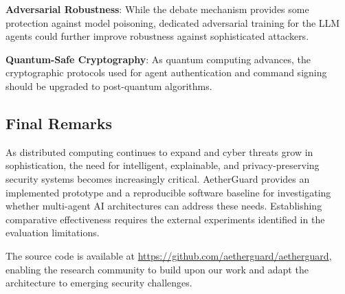 \textbf{Adversarial Robustness}: While the debate mechanism provides some protection against model poisoning, dedicated adversarial training for the LLM agents could further improve robustness against sophisticated attackers.

\textbf{Quantum-Safe Cryptography}: As quantum computing advances, the cryptographic protocols used for agent authentication and command signing should be upgraded to post-quantum algorithms.

\subsection{Final Remarks}

As distributed computing continues to expand and cyber threats grow in sophistication, the need for intelligent, explainable, and privacy-preserving security systems becomes increasingly critical. AetherGuard provides an implemented prototype and a reproducible software baseline for investigating whether multi-agent AI architectures can address these needs. Establishing comparative effectiveness requires the external experiments identified in the evaluation limitations.

The source code is available at \url{https://github.com/aetherguard/aetherguard}, enabling the research community to build upon our work and adapt the architecture to emerging security challenges.
